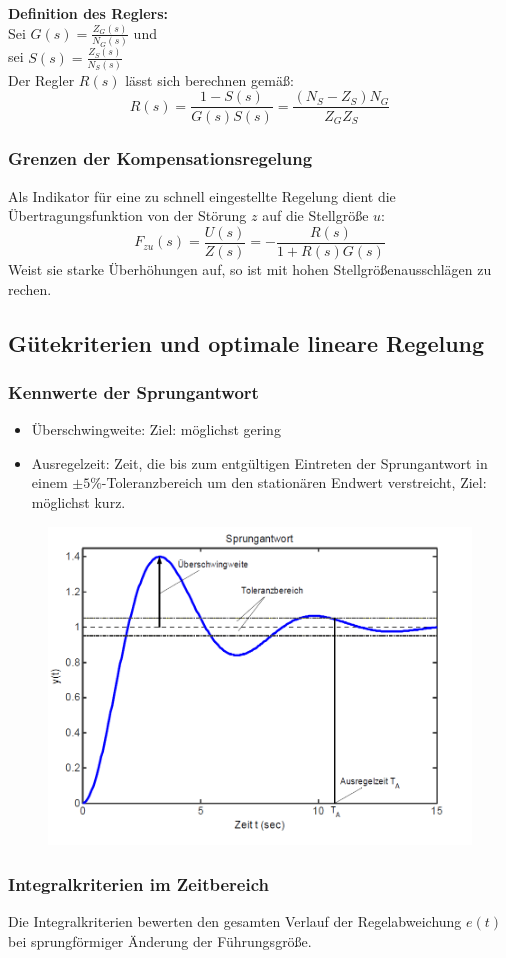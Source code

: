\documentclass[10pt,a4paper]{article}
\begin{document}
\textbf{Definition des Reglers:} \\
Sei $G(s) = \frac{Z_G(s)}{N_G(s)}$ und \\
sei $S(s) = \frac{Z_S(s)}{N_S(s)}$ \\
Der Regler $R(s)$ lässt sich berechnen gemäß:
$$
	R(s) = \frac{1 - S(s)}{G(s)S(s)} = \frac{(N_S - Z_S)N_G}{Z_GZ_S}
$$

\subsubsection{Grenzen der Kompensationsregelung}
Als Indikator für eine zu schnell eingestellte Regelung dient die Übertragungsfunktion von der Störung $z$ auf die Stellgröße $u$:
$$
	F_{zu}(s) = \frac{U(s)}{Z(s)} = - \frac{R(s)}{1 + R(s) G(s)}
$$
Weist sie starke Überhöhungen auf, so ist mit hohen Stellgrößenausschlägen zu rechen.

\subsection{Gütekriterien und optimale lineare Regelung}
\subsubsection{Kennwerte der Sprungantwort}
\begin{itemize}
	\item Überschwingweite: Ziel: möglichst gering
	\item Ausregelzeit: Zeit, die bis zum entgültigen Eintreten der Sprungantwort in einem $\pm 5 \%$-Toleranzbereich um den stationären Endwert verstreicht, Ziel: möglichst kurz.
\end{itemize}
\begin{figure}[H]
	\includegraphics[width = 0.4\columnwidth]{imgs/sprungantwort_kennwerte.png}
\end{figure}

\subsubsection{Integralkriterien im Zeitbereich}
Die Integralkriterien bewerten den gesamten Verlauf der Regelabweichung $e(t)$ bei sprungförmiger Änderung der Führungsgröße.
\end{document}
